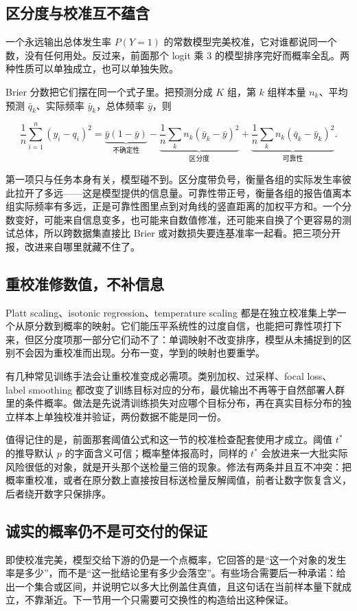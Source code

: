 \subsection{区分度与校准互不蕴含}

一个永远输出总体发生率 \(P(Y=1)\) 的常数模型完美校准，它对谁都说同一个数，没有任何用处。反过来，前面那个 logit 乘 \(3\) 的模型排序完好而概率全乱。两种性质可以单独成立，也可以单独失败。

Brier 分数把它们摆在同一个式子里。把预测分成 \(K\) 组，第 \(k\) 组样本量 \(n_k\)、平均预测 \(\bar q_k\)、实际频率 \(\bar y_k\)，总体频率 \(\bar y\)，则

\[
\frac1n\sum_{i=1}^n (y_i-q_i)^2
=\underbrace{\bar y(1-\bar y)}_{\text{不确定性}}
-\underbrace{\frac1n\sum_{k}n_k(\bar y_k-\bar y)^2}_{\text{区分度}}
+\underbrace{\frac1n\sum_{k}n_k(\bar q_k-\bar y_k)^2}_{\text{可靠性}} .
\]

第一项只与任务本身有关，模型碰不到。区分度带负号，衡量各组的实际发生率彼此拉开了多远——这是模型提供的信息量。可靠性带正号，衡量各组的报告值离本组实际频率有多远，正是可靠性图里点到对角线的竖直距离的加权平方和。一个分数变好，可能来自信息变多，也可能来自数值修准，还可能来自换了个更容易的测试总体，所以跨数据集直接比 Brier 或对数损失要连基准率一起看。把三项分开报，改进来自哪里就藏不住了。

\subsection{重校准修数值，不补信息}

Platt scaling、isotonic regression、temperature scaling 都是在独立校准集上学一个从原分数到概率的映射。它们能压平系统性的过度自信，也能把可靠性项打下来，但区分度项那一部分它们动不了：单调映射不改变排序，模型从未捕捉到的区别不会因为重校准而出现。分布一变，学到的映射也要重学。

有几种常见训练手法会让重校准变成必需项。类别加权、过采样、focal loss、label smoothing 都改变了训练目标对应的分布，最优输出不再等于自然部署人群里的条件概率。做法是先说清训练损失对应哪个目标分布，再在真实目标分布的独立样本上单独校准并验证，两份数据不能是同一份。

值得记住的是，前面那套阈值公式和这一节的校准检查配套使用才成立。阈值 \(t^\ast\) 的推导默认 \(p\) 的字面含义可信；概率整体报高时，同样的 \(t^\ast\) 会放进来一大批实际风险很低的对象，就是开头那个送检量三倍的现象。修法有两条并且互不冲突：把概率重校准，或者在原分数上直接按目标送检量反解阈值，前者让数字恢复含义，后者绕开数字只保排序。

\subsection{诚实的概率仍不是可交付的保证}

即使校准完美，模型交给下游的仍是一个点概率，它回答的是``这一个对象的发生率是多少''，而不是``这一批结论里有多少会落空''。有些场合需要后一种承诺：给出一个集合或区间，并说明它以多大比例盖住真值，且这句话在当前样本量下就成立，不靠渐近。下一节用一个只需要可交换性的构造给出这种保证。
